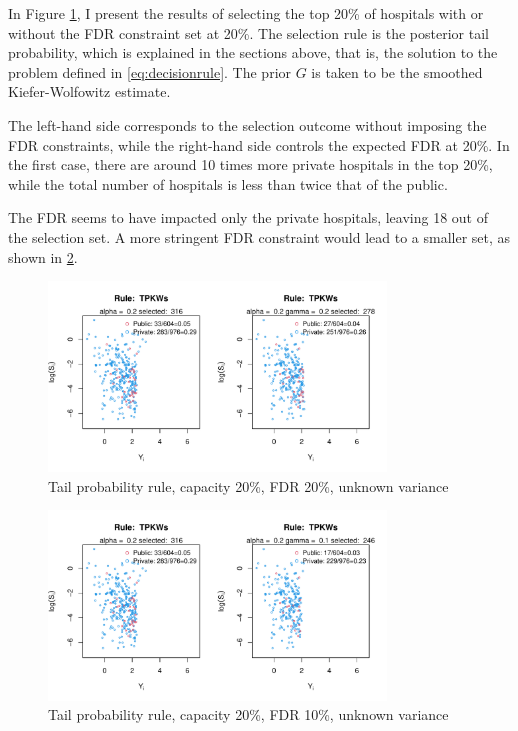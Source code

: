 \documentclass[12pt]{article}
\begin{document}
In Figure \ref{fig:tp_0.2_0.2_2d}, I present the results of selecting the top
20\% of hospitals with or without the FDR constraint set at 20\%. The selection
rule is the posterior tail probability, which is explained in the sections
above, that is, the solution to the problem defined in \ref{eq:decisionrule}.
The prior $G$ is taken to be the smoothed Kiefer-Wolfowitz estimate.

The left-hand side corresponds to the selection outcome without imposing the
FDR constraints, while the right-hand side controls the expected FDR at 20\%.
In the first case, there are around 10 times more private hospitals in the top
20\%, while the total number of hospitals is less than twice that of the
public.

The FDR seems to have impacted only the private hospitals, leaving 18 out of
the selection set. A more stringent FDR constraint would lead to a smaller set,
as shown in \ref{fig:tp_0.2_0.1_2d}.

\begin{figure}[h!]
    \centering
    \includegraphics[width=0.8\textwidth]{../../Figures/2013-2022/GMM_fd/GLVmix/Left_0.2_0.2_TPKWs.pdf}
    \caption{Tail probability rule, capacity 20\%, FDR 20\%, unknown variance}
    \label{fig:tp_0.2_0.2_2d}
\end{figure}

\begin{figure}[h!]
    \centering
    \includegraphics[width=0.8\textwidth]{../../Figures/2013-2022/GMM_fd/GLVmix/Left_0.2_0.1_TPKWs.pdf}
    \caption{Tail probability rule, capacity 20\%, FDR 10\%, unknown variance}
    \label{fig:tp_0.2_0.1_2d}
\end{figure}
\end{document}
